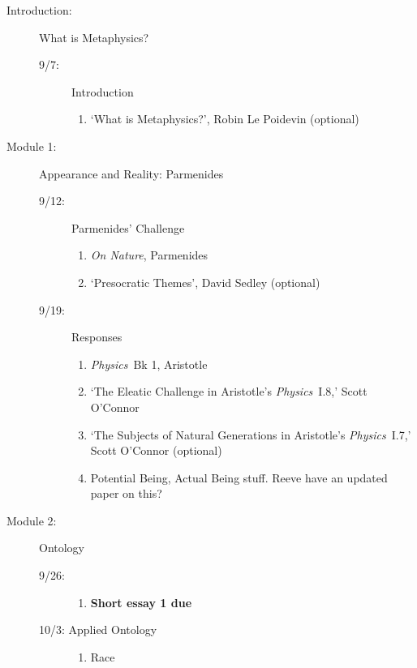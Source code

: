 \documentclass[article,oneside]{memoir}
\begin{document}
\begin{description}
\item[Introduction:]  What  is Metaphysics? 
\begin{description}
\item [9/7:] Introduction
\begin{enumerate}
\item `What is Metaphysics?', Robin Le Poidevin (optional)
\end{enumerate}
\end{description}

\item[Module 1:] Appearance and Reality: Parmenides 
\begin{description}
\item [9/12:] Parmenides' Challenge
\begin{enumerate}
\item \emph{On Nature}, Parmenides
\item `Presocratic Themes', David Sedley (optional)
\end{enumerate}

\item [9/19:] Responses 
\begin{enumerate}
\item \emph{Physics}\ Bk 1, Aristotle
\item `The Eleatic Challenge in Aristotle's \emph{Physics}\ I.8,' Scott O'Connor 
\item `The Subjects of Natural Generations in Aristotle's \emph{Physics}\ I.7,' Scott O'Connor (optional)
\item Potential Being, Actual Being stuff. Reeve have an updated paper on this? 
\end{enumerate}
\end{description}

\item[Module 2:] Ontology
\begin{description}
\item [9/26:] 
\begin{enumerate}
\item \textbf{Short essay 1 due}
\end{enumerate}

\item[10/3: Applied Ontology] 
\begin{enumerate}
\item Race
\end{enumerate}

\end{description}


\end{description}
\end{document}

